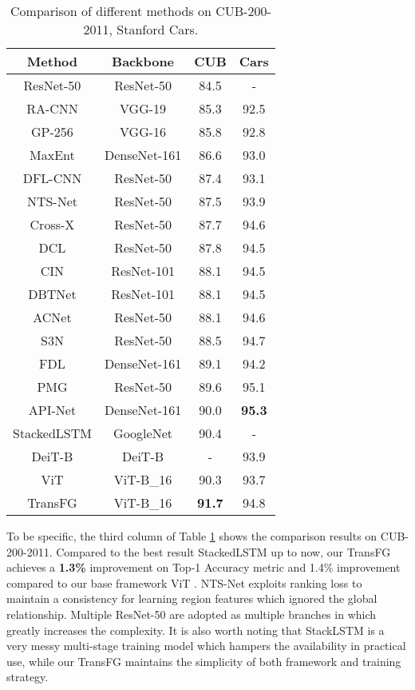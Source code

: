 \documentclass[10pt,twocolumn,letterpaper]{article}
\begin{document}
\begin{table}[]
    \small
    \centering
    \caption{Comparison of different methods on CUB-200-2011, Stanford Cars.}
    \label{tab:cub}
    \begin{tabular}{c|c|c|c}
    \hline
    Method & Backbone & CUB & Cars \\ \hline
    ResNet-50 \cite{he2015deep} & ResNet-50 & 84.5 & - \\
    RA-CNN \cite{fu2017look} & VGG-19 & 85.3 & 92.5 \\
    GP-256 \cite{wei2018grassmann} & VGG-16 & 85.8 & 92.8 \\
    MaxEnt \cite{NEURIPS2018_0c74b7f7} & DenseNet-161 & 86.6 & 93.0 \\
    DFL-CNN \cite{wang2018learning} & ResNet-50 & 87.4 & 93.1 \\
    NTS-Net \cite{yang2018learning} & ResNet-50 & 87.5 & 93.9 \\ 
    Cross-X \cite{luo2019cross} & ResNet-50 & 87.7 & 94.6 \\
    DCL \cite{chen2019destruction} & ResNet-50 & 87.8 & 94.5 \\
    CIN \cite{gao2020channel} & ResNet-101 & 88.1 & 94.5 \\
    DBTNet \cite{zheng2019learning} & ResNet-101 & 88.1 & 94.5 \\
    ACNet \cite{ji2020attention} & ResNet-50 & 88.1 & 94.6 \\
    S3N \cite{ding2019selective} & ResNet-50 & 88.5 & 94.7 \\
    FDL \cite{liu2020filtration} & DenseNet-161 & 89.1 & 94.2 \\
    PMG \cite{du2020fine} & ResNet-50 & 89.6 & 95.1 \\ 
    API-Net \cite{zhuang2020learning} & DenseNet-161 & 90.0 & \textbf{95.3} \\
    StackedLSTM \cite{Ge_2019_CVPR} & GoogleNet & 90.4 & - \\ \hline
    DeiT-B \cite{touvron2021training} & DeiT-B & - & 93.9 \\
    ViT \cite{dosovitskiy2020image} & ViT-B\_16 & 90.3 & 93.7 \\ 
    TransFG & ViT-B\_16 & \textbf{91.7} & 94.8 \\ \hline
    \end{tabular}
\end{table}

To be specific, the third column of Table \ref{tab:cub} shows the comparison results on CUB-200-2011. Compared to the best result StackedLSTM \cite{Ge_2019_CVPR} up to now, our TransFG achieves a \textbf{1.3\%} improvement on Top-1 Accuracy metric and 1.4\% improvement compared to our base framework ViT \cite{dosovitskiy2020image}. NTS-Net \cite{yang2018learning} exploits ranking loss to maintain a consistency for learning region features which ignored the global relationship. Multiple ResNet-50 are adopted as multiple branches in \cite{ding2019selective} which greatly increases the complexity. It is also worth noting that StackLSTM is a very messy multi-stage training model which hampers the availability in practical use, while our TransFG maintains the simplicity of both framework and training strategy.
\end{document}
